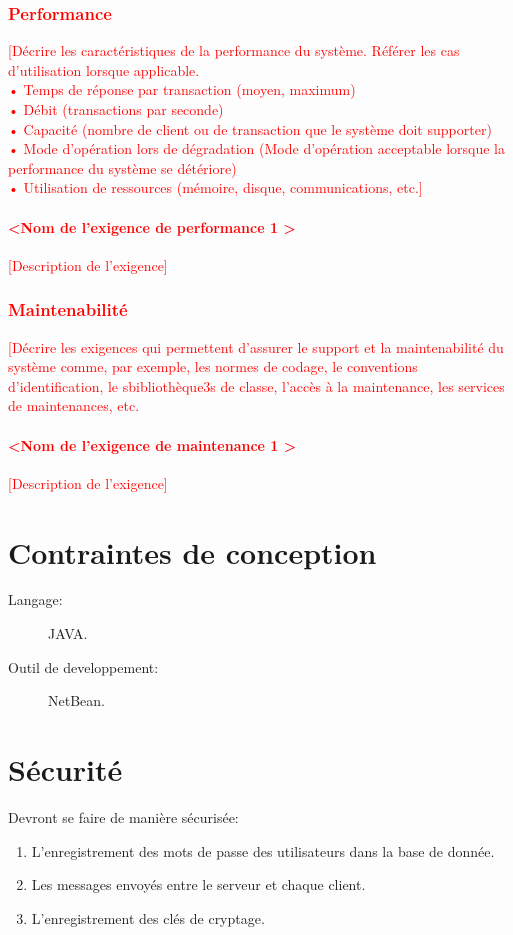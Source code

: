 \documentclass[10pt,a4paper]{report}
\begin{document}
\textcolor{red}{\subsubsection{Performance}
[Décrire les caractéristiques de la performance du système. Référer les cas d’utilisation lorsque applicable.\\
•	Temps de réponse par transaction (moyen, maximum)\\
•	Débit (transactions par seconde)\\
•	Capacité (nombre de client ou de transaction que le système doit supporter)\\
•	Mode d’opération lors de dégradation (Mode d’opération acceptable lorsque la performance du système se détériore)\\
•	Utilisation de ressources (mémoire, disque, communications, etc.]
\paragraph{\textless Nom de l’exigence de performance 1 \textgreater}
[Description de l’exigence]}

\textcolor{red}{\subsubsection{Maintenabilité}
[Décrire les exigences qui permettent d’assurer le support et la maintenabilité du système comme, par exemple, les normes de codage, le conventions d’identification, le sbibliothèque3s de classe, l’accès à la maintenance, les services de maintenances, etc. 
\paragraph{\textless Nom de l’exigence de maintenance 1 \textgreater}
[Description de l’exigence]}


\section{Contraintes de conception}
\begin{description}
\item[Langage:] JAVA.
\item[Outil de developpement:] NetBean.
\end{description}


\section{Sécurité}
Devront se faire de manière sécurisée:
\begin{enumerate}
\item L'enregistrement des mots de passe des utilisateurs dans la base de donnée.
\item Les messages envoyés entre le serveur et chaque client.
\item L'enregistrement des clés de cryptage.
\end{enumerate}
\end{document}
